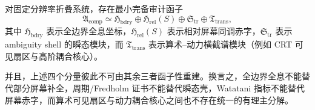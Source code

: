 \begin{conjecture}[固定分辨率完备审计四元组]\label{conj:conclusion-fixed-resolution-complete-audit-quadriga}
对固定分辨率折叠系统，存在最小完备审计函子
\[
\mathfrak A_{\mathrm{comp}}
\simeq
\mathfrak H_{\mathrm{bdry}}
\oplus
\mathfrak H_{\mathrm{rel}}(S)
\oplus
\mathfrak S_{\mathrm{tr}}
\oplus
\mathfrak T_{\mathrm{trans}},
\]
其中 \(\mathfrak H_{\mathrm{bdry}}\) 表示全边界全息坐标，\(\mathfrak H_{\mathrm{rel}}(S)\) 表示相对屏幕同调赤字，\(\mathfrak S_{\mathrm{tr}}\) 表示 ambiguity shell 的瞬态模块，而 \(\mathfrak T_{\mathrm{trans}}\) 表示算术--动力横截谱模块（例如 CRT 可见扇区与高阶耦合核心）。

并且，上述四个分量彼此不可由其余三者函子性重建。换言之，全边界全息不能替代部分屏幕补全，周期/Fredholm 证书不能替代瞬态壳，Watatani 指标不能替代屏幕赤字，而算术可见扇区与动力耦合核心之间也不存在统一的有理主分解。
\end{conjecture}
